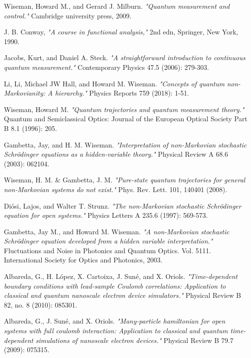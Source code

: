 \documentclass[11pt, a4paper]{article} %
\begin{document}
\begin{thebibliography}{1}
{
Wiseman, Howard M., and Gerard J. Milburn. {\em "Quantum measurement and control."} Cambridge university press, 2009.

J. B. Conway, {\em "A course in functional analysis,"} 2nd edn, Springer, New York, 1990.

Jacobs, Kurt, and Daniel A. Steck. {\em "A straightforward introduction to continuous quantum measurement."} Contemporary Physics 47.5 (2006): 279-303.

Li, Li, Michael JW Hall, and Howard M. Wiseman. {\em "Concepts of quantum non-Markovianity: A hierarchy."} Physics Reports 759 (2018): 1-51.

Wiseman, Howard M. {\em "Quantum trajectories and quantum measurement theory."} Quantum and Semiclassical Optics: Journal of the European Optical Society Part B 8.1 (1996): 205.

Gambetta, Jay, and H. M. Wiseman. {\em "Interpretation of non-Markovian stochastic Schrödinger equations as a hidden-variable theory."} Physical Review A 68.6 (2003): 062104.

Wiseman, H. M. \& Gambetta, J. M. {\em "Pure-state quantum trajectories for general non-Markovian systems do not exist."} Phys. Rev. Lett. 101, 140401 (2008).

Diósi, Lajos, and Walter T. Strunz. {\em "The non-Markovian stochastic Schrödinger equation for open systems."} Physics Letters A 235.6 (1997): 569-573.

Gambetta, Jay M., and Howard M. Wiseman. {\em "A non-Markovian stochastic Schrödinger equation developed from a hidden variable interpretation."} Fluctuations and Noise in Photonics and Quantum Optics. Vol. 5111. International Society for Optics and Photonics, 2003.

Albareda, G., H. López, X. Cartoixa, J. Suné, and X. Oriols. {\em "Time-dependent boundary conditions with lead-sample Coulomb correlations: Application to classical and quantum nanoscale electron device simulators."} Physical Review B 82, no. 8 (2010): 085301.

Albareda, G., J. Suné, and X. Oriols. {\em "Many-particle hamiltonian for open systems with full coulomb interaction: Application to classical and quantum time-dependent simulations of nanoscale electron devices."} Physical Review B 79.7 (2009): 075315.

}
\end{thebibliography}
\end{document}
